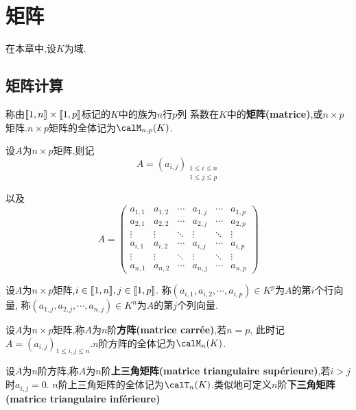 \chapter{矩阵}

在本章中,设$K$为域.

\section{矩阵计算}

\begin{deff}
    称由$\llbracket 1, n \rrbracket \times \llbracket 1, p \rrbracket$标记的$K$中的族为$n$行$p$列
    系数在$K$中的\textbf{矩阵(matrice)},或$n \times p$矩阵.$n \times p$矩阵的全体记为$\calM_{n, p}(K)$.
\end{deff}

\begin{rqq}
    设$A$为$n \times p$矩阵,则记
    \[ A = (a_{i, j})_{\substack{1 \leqslant i \leqslant n \\ 1 \leqslant j \leqslant p}} \]

    以及
    \[ A = \begin{pmatrix}
        a_{1, 1} & a_{1, 2} & \cdots & a_{1, j} & \cdots & a_{1, p} \\
        a_{2,1} & a_{2,2} & \cdots & a_{2,j} & \cdots & a_{2,p} \\
        \vdots & \vdots & \ddots & \vdots & \ddots & \vdots \\
        a_{i, 1} & a_{i,2} & \cdots & a_{i,j} & \cdots & a_{i,p} \\
        \vdots & \vdots & \ddots & \vdots & \ddots & \vdots \\
        a_{n,1} & a_{n,2} & \cdots & a_{n,j} & \cdots & a_{n,p}
    \end{pmatrix} \]
\end{rqq}

\begin{rqq}
    设$A$为$n \times p$矩阵,$i \in \llbracket 1, n \rrbracket, j \in \llbracket 1, p \rrbracket$.
    称$(a_{i, 1}, a_{i, 2}, \cdots, a_{i, p}) \in K^p$为$A$的第$i$个行向量,
    称$(a_{1, j}, a_{2, j}, \cdots, a_{n, j}) \in K^n$为$A$的第$j$个列向量.
\end{rqq}

\begin{deff}
    设$A$为$n \times p$矩阵,称$A$为$n$阶\textbf{方阵(matrice carrée)},若$n = p$,
    此时记$A = (a_{i, j})_{1 \leqslant i, j \leqslant n}$.$n$阶方阵的全体记为$\calM_n(K)$.
\end{deff}

\begin{deff}
    设$A$为$n$阶方阵,称$A$为$n$阶\textbf{上三角矩阵(matrice triangulaire supérieure)},若$i > j$时$a_{i, j} = 0$.
    $n$阶上三角矩阵的全体记为$\calT_n(K)$.类似地可定义$n$阶\textbf{下三角矩阵(matrice triangulaire inférieure)}
\end{deff}

